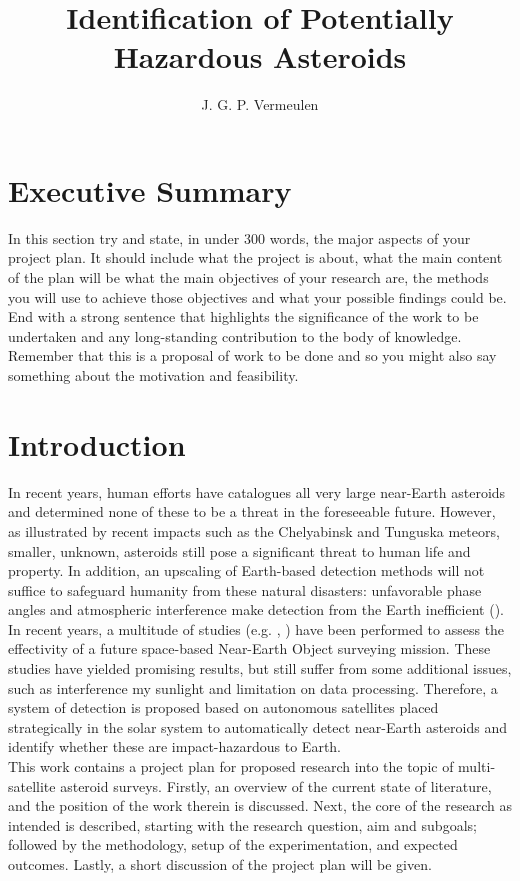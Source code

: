 \documentclass[12pt, english, NoHyper]{AE4010-template}
\title{Identification of Potentially Hazardous Asteroids}
\author{J. G. P. Vermeulen}
\begin{document}
\maketitle

\section*{Executive Summary}
In this section try and state, in under 300 words, the major aspects of your project plan. It should include what the project is about, what the main content of the plan will be what the main objectives of your research are, the methods you will use to achieve those objectives and what your possible findings could be. End with a strong sentence that highlights the significance of the work to be undertaken and any long-standing contribution to the body of knowledge. Remember that this is a proposal of work to be done and so you might also say something about the motivation and feasibility.





\section{Introduction}
In recent years, human efforts have catalogues all very large near-Earth asteroids and determined none of these to be a threat in the foreseeable future. However, as illustrated by recent impacts such as the Chelyabinsk and Tunguska meteors, smaller, unknown, asteroids still pose a significant threat to human life and property. In addition, an upscaling of Earth-based detection methods will not suffice to safeguard humanity from these natural disasters: unfavorable phase angles and atmospheric interference make detection from the Earth inefficient (\cite{DefendingPlanetEarth}). In recent years, a multitude of studies (e.g. \cite{NEOSDT1}, \cite{ThesisOlga}) have been performed to assess the effectivity of a future space-based Near-Earth Object surveying mission. These studies have yielded promising results, but still suffer from some additional issues, such as interference my sunlight and limitation on data processing. Therefore, a system of detection is proposed based on autonomous satellites placed strategically in the solar system to automatically detect near-Earth asteroids and identify whether these are impact-hazardous to Earth. \\

This work contains a project plan for proposed research into the topic of multi-satellite asteroid surveys. Firstly, an overview of the current state of literature, and the position of the work therein is discussed. Next, the core of the research as intended is described, starting with the research question, aim and subgoals; followed by the methodology, setup of the experimentation, and expected outcomes. Lastly, a short discussion of the project plan will be given.
\end{document}
